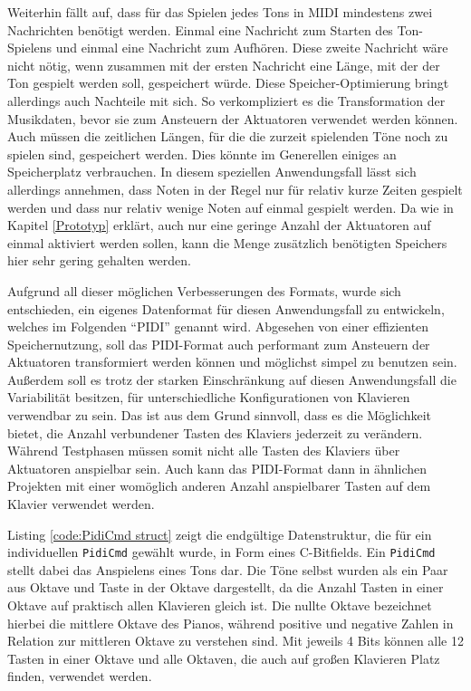 Weiterhin fällt auf, dass für das Spielen jedes Tons in \ac{MIDI} mindestens zwei Nachrichten benötigt werden.
Einmal eine Nachricht zum Starten des Ton-Spielens und einmal eine Nachricht zum Aufhören.
Diese zweite Nachricht wäre nicht nötig, wenn zusammen mit der ersten Nachricht eine Länge, mit der der Ton gespielt werden soll, gespeichert würde.
Diese Speicher-Optimierung bringt allerdings auch Nachteile mit sich.
So verkompliziert es die Transformation der Musikdaten, bevor sie zum Ansteuern der Aktuatoren verwendet werden können.
Auch müssen die zeitlichen Längen, für die die zurzeit spielenden Töne noch zu spielen sind, gespeichert werden.
Dies könnte im Generellen einiges an Speicherplatz verbrauchen.
In diesem speziellen Anwendungsfall lässt sich allerdings annehmen, dass Noten in der Regel nur für relativ kurze Zeiten gespielt werden und dass nur relativ wenige Noten auf einmal gespielt werden.
Da wie in Kapitel \ref{Prototyp} erklärt, auch nur eine geringe Anzahl der Aktuatoren auf einmal aktiviert werden sollen, kann die Menge zusätzlich benötigten Speichers hier sehr gering gehalten werden.

Aufgrund all dieser möglichen Verbesserungen des Formats, wurde sich entschieden, ein eigenes Datenformat für diesen Anwendungsfall zu entwickeln, welches im Folgenden \enquote{\ac{PIDI}} genannt wird.
Abgesehen von einer effizienten Speichernutzung, soll das \ac{PIDI}-Format auch performant zum Ansteuern der Aktuatoren transformiert werden können und möglichst simpel zu benutzen sein.
Außerdem soll es trotz der starken Einschränkung auf diesen Anwendungsfall die Variabilität besitzen, für unterschiedliche Konfigurationen von Klavieren verwendbar zu sein.
Das ist aus dem Grund sinnvoll, dass es die Möglichkeit bietet, die Anzahl verbundener Tasten des Klaviers jederzeit zu verändern.
Während Testphasen müssen somit nicht alle Tasten des Klaviers über Aktuatoren anspielbar sein.
Auch kann das \ac{PIDI}-Format dann in ähnlichen Projekten mit einer womöglich anderen Anzahl anspielbarer Tasten auf dem Klavier verwendet werden.

Listing \ref{code:PidiCmd struct} zeigt die endgültige Datenstruktur, die für ein individuellen \lstinline{PidiCmd} gewählt wurde, in Form eines C-Bitfields.
Ein \lstinline{PidiCmd} stellt dabei das Anspielens eines Tons dar.
Die Töne selbst wurden als ein Paar aus Oktave und Taste in der Oktave dargestellt, da die Anzahl Tasten in einer Oktave auf praktisch allen Klavieren gleich ist.
Die nullte Oktave bezeichnet hierbei die mittlere Oktave des Pianos, während positive und negative Zahlen in Relation zur mittleren Oktave zu verstehen sind.
Mit jeweils 4 Bits können alle 12 Tasten in einer Oktave und alle Oktaven, die auch auf großen Klavieren Platz finden, verwendet werden.

